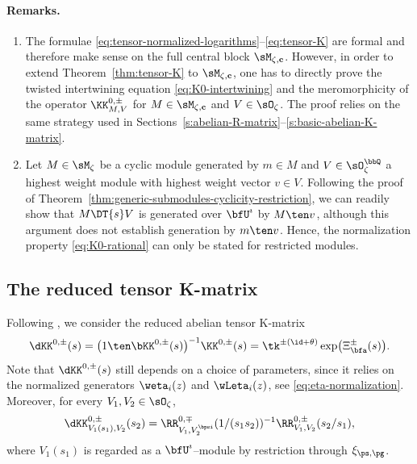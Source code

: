 \documentclass[reqno]{amsart}
\numberwithin{equation}{section}
\newenvironment{remarks}{\medskip\paragraph{{\bf Remarks.} }}{\par\medskip}
\begin{document}
\begin{remarks}
\hfill
\begin{enumerate}[leftmargin=2em]\itemsep0.25cm
\item 
The formulae \eqref{eq:tensor-normalized-logarithms}--\eqref{eq:tensor-K}
are formal and therefore make sense on the full central block 
$\sM_{\zeta,\mathbf c}$.
However, in order to extend Theorem~\ref{thm:tensor-K} to $\sM_{\zeta,\mathbf c}$, one has to directly prove the twisted intertwining equation \eqref{eq:K0-intertwining} and the meromorphicity of the operator $\KK^{0,\pm}_{M,V}$ for $M\in\sM_{\zeta,\mathbf c}$ and $V\in\sO_\zeta$.
The proof relies on the same strategy used in Sections~\ref{s:abelian-R-matrix}--\ref{s:basic-abelian-K-matrix}.
\item
Let $M\in\sM_\zeta$ be a cyclic module generated by $m\in M$ and $V\in\sO_\zeta^\bbQ$ a highest weight module with highest weight vector $v\in V$.
Following the proof of Theorem~\ref{thm:generic-submodules-cyclicity-restriction}, we can readily show that
$M\DT{s}V$ is generated over $\bfU^\imath$ by $M\ten v$, although this argument does not establish generation by $m\ten v$. Hence, the normalization property \eqref{eq:K0-rational} can only be stated for restricted modules.
\hfill\rmkend
\end{enumerate}
\end{remarks}

\subsection{The reduced tensor K-matrix}
\label{ss:reduced-tensor-K0}
Following \cite[Sec.~6]{appel-vlaar-25c}, we consider the
{reduced abelian tensor K-matrix}
\begin{equation}\label{eq:reduced-tensor-K}
\dKK^{0,\pm}(s)
=
\bigl(1\ten\bKK^{0,\pm}(s)\bigr)^{-1}
\KK^{0,\pm}(s)
=
\tk^{\pm(\id+\theta)}
\exp\bigl(\Xi_{\bfa}^{\pm}(s)\bigr).
\end{equation}
Note that $\dKK^{0,\pm}(s)$ still depends on a choice of parameters, since
it relies on the normalized generators $\weta_i(z)$ and $\wLeta_i(z)$, see \eqref{eq:eta-normalization}. Moreover, for every $V_1,V_2\in\sO_\zeta$,
\begin{equation}
{\dKK}^{0,\pm}_{V_1(s_1),V_2}(s_2)
=
\RR^{0,\mp}_{V_1,V_2^\bpsi}(1/(s_1s_2))^{-1}
\RR^{0,\pm}_{V_1,V_2}(s_2/s_1),
\end{equation}
where $V_1(s_1)$ is regarded as a $\bfU^\imath$--module by restriction through
$\xi_{\ps,\pg}$.
\end{document}
